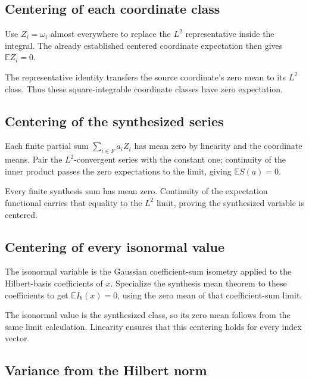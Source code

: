 \documentclass[11pt,a4paper]{article}
\begin{document}
\subsection{\texorpdfstring{Centering of each coordinate class}{Centering of each coordinate class}}


Use \(Z_i=\omega_i\) almost everywhere to replace the \(L^2\) representative inside the integral. The already established centered coordinate expectation then gives \(\mathbb EZ_i=0\).



The representative identity transfers the source coordinate's zero mean to its \(L^2\) class. Thus these square-integrable coordinate classes have zero expectation.


\subsection{\texorpdfstring{Centering of the synthesized series}{Centering of the synthesized series}}


Each finite partial sum \(\sum_{i\in F}a_iZ_i\) has mean zero by linearity and the coordinate means. Pair the \(L^2\)-convergent series with the constant one; continuity of the inner product passes the zero expectations to the limit, giving \(\mathbb ES(a)=0\).



Every finite synthesis sum has mean zero. Continuity of the expectation functional carries that equality to the \(L^2\) limit, proving the synthesized variable is centered.


\subsection{\texorpdfstring{Centering of every isonormal value}{Centering of every isonormal value}}


The isonormal variable is the Gaussian coefficient-sum isometry applied to the Hilbert-basis coefficients of \(x\). Specialize the synthesis mean theorem to these coefficients to get \(\mathbb EI_b(x)=0\), using the zero mean of that coefficient-sum limit.



The isonormal value is the synthesized class, so its zero mean follows from the same limit calculation. Linearity ensures that this centering holds for every index vector.


\subsection{\texorpdfstring{Variance from the Hilbert norm}{Variance from the Hilbert norm}}
\end{document}
